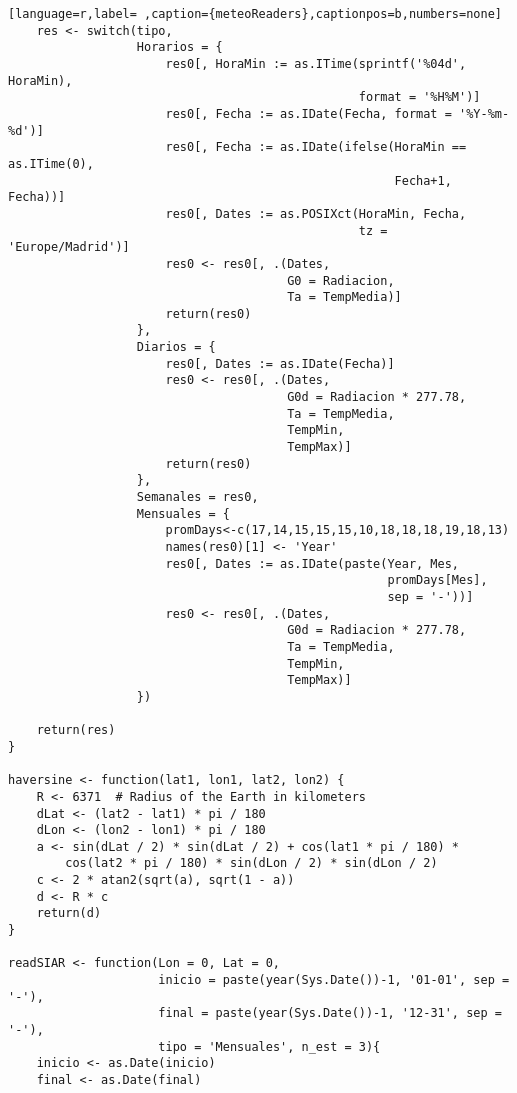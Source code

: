 \begin{lstlisting}[language=r,label= ,caption={meteoReaders},captionpos=b,numbers=none]
    res <- switch(tipo,
                  Horarios = {
                      res0[, HoraMin := as.ITime(sprintf('%04d', HoraMin),
                                                 format = '%H%M')]
                      res0[, Fecha := as.IDate(Fecha, format = '%Y-%m-%d')]
                      res0[, Fecha := as.IDate(ifelse(HoraMin == as.ITime(0),
                                                      Fecha+1, Fecha))]
                      res0[, Dates := as.POSIXct(HoraMin, Fecha,
                                                 tz = 'Europe/Madrid')]
                      res0 <- res0[, .(Dates,
                                       G0 = Radiacion,
                                       Ta = TempMedia)]
                      return(res0)
                  },
                  Diarios = {
                      res0[, Dates := as.IDate(Fecha)]
                      res0 <- res0[, .(Dates,
                                       G0d = Radiacion * 277.78,
                                       Ta = TempMedia,
                                       TempMin,
                                       TempMax)]
                      return(res0)
                  },
                  Semanales = res0,
                  Mensuales = {
                      promDays<-c(17,14,15,15,15,10,18,18,18,19,18,13)
                      names(res0)[1] <- 'Year'
                      res0[, Dates := as.IDate(paste(Year, Mes,
                                                     promDays[Mes],
                                                     sep = '-'))]
                      res0 <- res0[, .(Dates,
                                       G0d = Radiacion * 277.78,
                                       Ta = TempMedia,
                                       TempMin,
                                       TempMax)]
                  })

    return(res)
}

haversine <- function(lat1, lon1, lat2, lon2) {
    R <- 6371  # Radius of the Earth in kilometers
    dLat <- (lat2 - lat1) * pi / 180
    dLon <- (lon2 - lon1) * pi / 180
    a <- sin(dLat / 2) * sin(dLat / 2) + cos(lat1 * pi / 180) *
        cos(lat2 * pi / 180) * sin(dLon / 2) * sin(dLon / 2)
    c <- 2 * atan2(sqrt(a), sqrt(1 - a))
    d <- R * c
    return(d)
}

readSIAR <- function(Lon = 0, Lat = 0,
                     inicio = paste(year(Sys.Date())-1, '01-01', sep = '-'),
                     final = paste(year(Sys.Date())-1, '12-31', sep = '-'),
                     tipo = 'Mensuales', n_est = 3){
    inicio <- as.Date(inicio)
    final <- as.Date(final)


\end{lstlisting}
